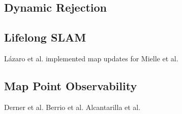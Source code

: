 \subsection{Dynamic Rejection}

\subsection{Lifelong SLAM}
Lázaro et al. \cite{lazaroEfficientLongtermMapping2018} implemented map updates for
Mielle et al. \cite{mielleSLAMAutocompleteCompleting2017}

\subsection{Map Point Observability}
Derner et al. \cite{dernerChangeDetectionUsing2021}
Berrio et al. \cite{berrioUpdatingVisibilityFeaturebased2019}\cite{berrioLongtermMapMaintenance2020}
Alcantarilla et al. \cite{alcantarillaLearningVisibilityLandmarks2010}